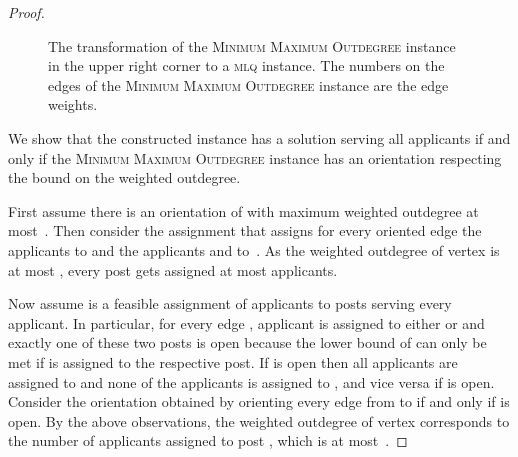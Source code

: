 \documentclass{llncs}
\begin{document}
\begin{proof}
\begin{figure}[htbp]
\caption{The transformation of the \textsc{Minimum Maximum Outdegree} instance in the upper right corner to a \textsc{mlq} instance. The numbers on the edges of the \textsc{Minimum Maximum Outdegree} instance are the edge weights.}
\label{fi:theorem6}
\end{figure}

  We show that the constructed instance has a solution serving all applicants if and only if the \textsc{Minimum Maximum Outdegree} instance has an orientation respecting the bound on the weighted outdegree. 
  
  First assume there is an orientation  of  with maximum weighted outdegree at most~. Then consider the assignment that assigns for every oriented edge  the  applicants  to  and the  applicants  and  to~. As the weighted outdegree of vertex  is at most , every post  gets assigned at most  applicants.
  
  Now assume  is a feasible assignment of applicants to posts serving every applicant. In particular, for every edge , applicant  is assigned to either  or  and exactly one of these two posts is open because the lower bound of  can only be met if  is assigned to the respective post. If  is open then all  applicants  are assigned to  and none of the applicants  is assigned to , and vice versa if  is open. Consider the orientation obtained by orienting every edge  from  to  if and only if  is open. By the above observations, the weighted outdegree of vertex  corresponds to the number of applicants assigned to post , which is at most~.
  

\end{proof}
\end{document}
